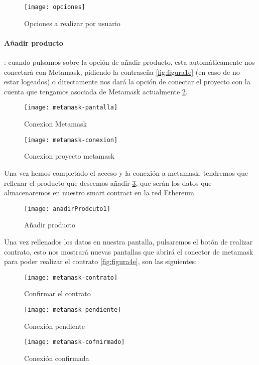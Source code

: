 \begin{figure}[h!]
    \centering
    \texttt{[image: opciones]}
    \caption{Opciones a realizar por usuario}
    \label{fig:opciones}
\end{figure}

\paragraph{Añadir producto}: cuando pulsamos sobre la opción de añadir producto, esta automáticamente nos conectará con Metamask, pidiendo la contraseña \ref{fig:figura1e} (en caso de no estar logeados) o directamente nos dará la opción de conectar el proyecto con la cuenta que tengamos asociada de Metamask actualmente \ref{fig:figura2e}.

\begin{figure}[H]
	\begin{minipage}[b]{0.5\linewidth}
		\centering
		\texttt{[image: metamask-pantalla]}
		\caption{Conexion Metamask}
		\label{fig:figura1e}
	\end{minipage}
	\hspace{0.5cm}
	\begin{minipage}[b]{0.5\linewidth}
		\centering
		\texttt{[image: metamask-conexion]}
		\caption{Conexion proyecto metamask}
		\label{fig:figura2e}
	\end{minipage}
\end{figure}

Una vez hemos completado el acceso y la conexión a metamask, tendremos que rellenar el producto que deseemos añadir \ref{fig:figura3e}, que serán los datos que almacenaremos en nuestro smart contract en la red Ethereum. 

\begin{figure}[H]
    \centering
    \texttt{[image: anadirProdcuto1]}
    \caption{Añadir producto}
    \label{fig:figura3e}
\end{figure}

Una vez rellenados los datos en nuestra pantalla, pulsaremos el botón de realizar contrato, esto nos mostrará nuevas pantallas que abrirá el conector de metamask para poder realizar el contrato \ref{fig:figura4e}, son las siguientes:

\begin{figure}[h!]
	\begin{minipage}[b]{0.5\linewidth}
		\centering
		\texttt{[image: metamask-contrato]}
		\caption{Confirmar el contrato}
		\label{fig:figura4e}
	\end{minipage}
\hspace{0.5cm}
	\begin{minipage}[b]{0.5\linewidth}
		\centering
		\texttt{[image: metamask-pendiente]}
		\caption{Conexión pendiente}
		\label{fig:figura5e}
	\end{minipage}
	\begin{minipage}[b]{0.8\linewidth}
		\centering
		\texttt{[image: metamask-cofnirmado]}
		\caption{Conexión confirmada}
		\label{fig:figura6e}
	\end{minipage}
\end{figure}

